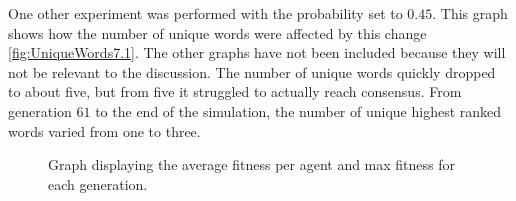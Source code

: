 One other experiment was performed with the probability set to $0.45$. This graph shows how the number of unique words were affected by this change \ref{fig:UniqueWords7.1}. The other graphs have not been included because they will not be relevant to the discussion. The number of unique words quickly dropped to about five, but from five it struggled to actually reach consensus. From generation $61$ to the end of the simulation, the number of unique highest ranked words varied from one to three.  
\begin{figure}[htbp]
    \centering
    \hfill
    \par\bigskip
    \caption{Graph displaying the average fitness per agent and max fitness for each generation.}
    \label{fig:Fitness7}
\end{figure}
